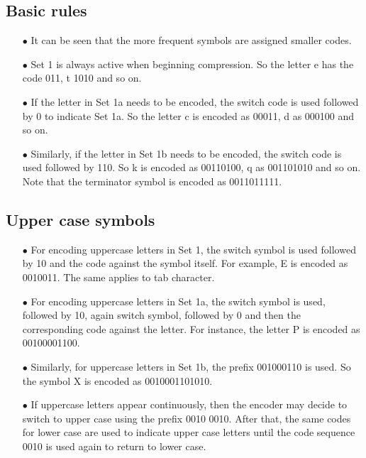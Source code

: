 \documentclass[]{article}
\begin{document}
\subsection{Basic rules}
\begin{itemize}
	\item[$\bullet$] It can be seen that the more frequent symbols are assigned smaller codes.
	\item[$\bullet$] Set 1 is always active when beginning compression.  So the letter e has the code 011, t 1010 and so on.
	\item[$\bullet$] If the letter in Set 1a needs to be encoded, the switch code is used followed by 0 to indicate Set 1a.  So the letter c is encoded as 00011, d as 000100 and so on.
	\item[$\bullet$] Similarly, if the letter in Set 1b needs to be encoded, the switch code is used followed by 110. So k is encoded as 00110100, q as 001101010 and so on. Note that the terminator symbol is encoded as 0011011111.
\end{itemize}

\subsection{Upper case symbols}
\begin{itemize}
	\item[$\bullet$] For encoding uppercase letters in Set 1, the switch symbol is used followed by 10 and the code against the symbol itself.  For example, E is encoded as 0010011.  The same applies to tab character.
	\item[$\bullet$] For encoding uppercase letters in Set 1a, the switch symbol is used, followed by 10, again switch symbol, followed by 0 and then the corresponding code against the letter.  For instance, the letter P is encoded as 00100001100.
	\item[$\bullet$] Similarly, for uppercase letters in Set 1b, the prefix 001000110 is used.  So the symbol X is encoded as 0010001101010.
	\item[$\bullet$] If uppercase letters appear continuously, then the encoder may decide to switch to upper case using the prefix 0010 0010.  After that, the same codes for lower case are used to indicate upper case letters until the code sequence 0010 is used again to return to lower case.
\end{itemize}
\end{document}

